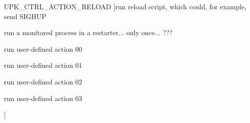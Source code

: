 \begin{Desc}
\begin{description}
{UPK\_\-CTRL\_\-ACTION\_\-RELOAD\label{group__controller_gga0d570130f3428734fef617272f44b7c9a383e3644953490dd862c59e008f4fbb1}
}]run reload script, which could, for example, send SIGHUP \item[{\em 
UPK\_\-CTRL\_\-ACTION\_\-RUNONCE\label{group__controller_gga0d570130f3428734fef617272f44b7c9acaa9604bc8089b99580466955f2de9ca}
}]run a monitored process in a restarter... only once... ??? \item[{\em 
UPK\_\-CTRL\_\-CUSTOM\_\-ACTION\_\-00\label{group__controller_gga0d570130f3428734fef617272f44b7c9ad4d2d51e88be2a15e52904a3156add31}
}]run user-\/defined action 00 \item[{\em 
UPK\_\-CTRL\_\-CUSTOM\_\-ACTION\_\-01\label{group__controller_gga0d570130f3428734fef617272f44b7c9ac755fb8c7ea7a3fa3a42559451ceb92f}
}]run user-\/defined action 01 \item[{\em 
UPK\_\-CTRL\_\-CUSTOM\_\-ACTION\_\-02\label{group__controller_gga0d570130f3428734fef617272f44b7c9ade6a2b269652eda6621f40c9319307cd}
}]run user-\/defined action 02 \item[{\em 
UPK\_\-CTRL\_\-CUSTOM\_\-ACTION\_\-03\label{group__controller_gga0d570130f3428734fef617272f44b7c9aff1cd1fc7ac92bb8e6d9a50944f3fd46}
}]run user-\/defined action 03 \item[{\em 
}
\end{description}
\end{Desc}
